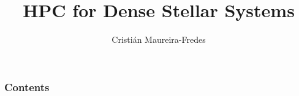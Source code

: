 \documentclass[english]{beamer}
\author[C. Maureira-Fredes]
       {\large Cristián Maureira-Fredes}
\title[HPC DSS]
      {\huge HPC for Dense Stellar Systems}
\institute[AEI]
          {Albert Einstein Institute}
\begin{document}
%

\begin{frame}[t,plain]
    \titlepage
\end{frame}

\begin{frame}
    \frametitle{Contents}
    \tableofcontents
\end{frame}







\begin{frame}[t,plain]
\titlepage
\end{frame}

\begin{frame}[allowframebreaks]
\footnotesize

\end{frame}
\end{document}

